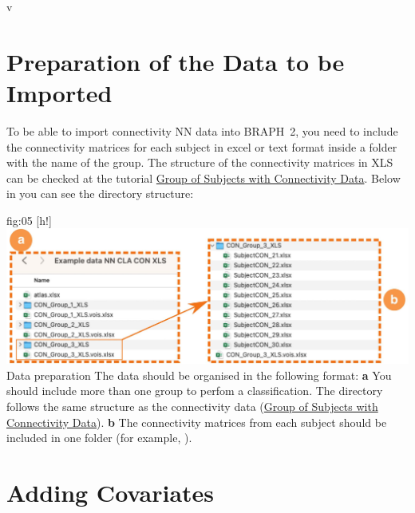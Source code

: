 v\documentclass[justified]{tufte-handout}
\begin{document}
\clearpage
\section{Preparation of the Data to be Imported}

To be able to import connectivity NN data into BRAPH~2, you need to include the connectivity matrices for each subject in excel or text format inside a folder with the name of the group. The structure of the connectivity matrices in XLS can be checked at the tutorial \href{https://github.com/braph-software/BRAPH-2/tree/develop/tutorials/general/tut_gr_con}{Group of Subjects with Connectivity Data}. Below in  you can see the directory structure:

	{fig:05}
	{
	[h!]
	\includegraphics{fig05.jpg}
	}
	{Data preparation}
	{
	The data should be organised in the following format:
	{\bf a} You should include more than one group to perfom a classification. The directory follows the same structure as the connectivity data (\href{https://github.com/braph-software/BRAPH-2/tree/develop/tutorials/general/tut_gr_con}{Group of Subjects with Connectivity Data}). 
	{\bf b} The connectivity matrices from each subject should be included in one folder (for example, ). 
	} 


\section{Adding Covariates}
\end{document}
